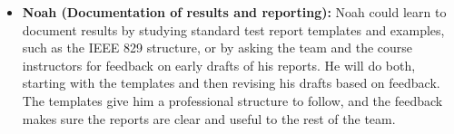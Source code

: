 \documentclass[12pt, titlepage]{article}
\begin{document}
\begin{enumerate}
\begin{itemize}
    \item \textbf{Noah (Documentation of results and reporting):} Noah could
    learn to document results by studying standard test report templates and
    examples, such as the IEEE 829 structure, or by asking the team and the
    course instructors for feedback on early drafts of his reports. He will do
    both, starting with the templates and then revising his drafts based on
    feedback. The templates give him a professional structure to follow, and the
    feedback makes sure the reports are clear and useful to the rest of the team.
  \end{itemize}
\end{enumerate}
\end{document}
